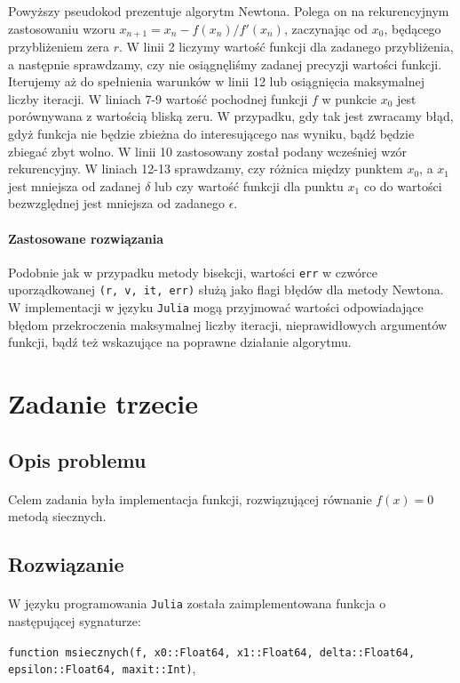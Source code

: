 \documentclass[a4paper]{article}
\begin{document}
Powyższy pseudokod prezentuje algorytm Newtona. Polega on na rekurencyjnym zastosowaniu wzoru $x_{n+1} = x_{n} - f(x_{n}) / f'(x_{n})$, zaczynając od $x_{0}$, będącego przybliżeniem zera $r$. W linii 2 liczymy wartość funkcji dla zadanego przybliżenia, a następnie sprawdzamy, czy nie osiągnęliśmy zadanej precyzji wartości funkcji. Iterujemy aż do spełnienia warunków w linii 12 lub osiągnięcia maksymalnej liczby iteracji. W liniach 7-9 wartość pochodnej funkcji $f$ w punkcie $x_{0}$ jest porównywana z wartością bliską zeru. W przypadku, gdy tak jest zwracamy błąd, gdyż funkcja nie będzie zbieżna do interesującego nas wyniku, bądź będzie zbiegać zbyt wolno. W linii 10 zastosowany został podany wcześniej wzór rekurencyjny. W liniach 12-13 sprawdzamy, czy różnica między punktem $x_{0}$, a $x_{1}$ jest mniejsza od zadanej $\delta$ lub czy wartość funkcji dla punktu $x_{1}$ co do wartości bezwzględnej jest mniejsza od zadanego $\epsilon$.

\paragraph{Zastosowane rozwiązania}
Podobnie jak w przypadku metody bisekcji, wartości \texttt{err} w czwórce uporządkowanej \texttt{(r, v, it, err)} służą jako flagi błędów dla metody Newtona. W implementacji w języku \texttt{Julia} mogą przyjmować wartości odpowiadające błędom przekroczenia maksymalnej liczby iteracji, nieprawidłowych argumentów funkcji, bądź też wskazujące na poprawne działanie algorytmu.

\section{Zadanie trzecie}

\subsection{Opis problemu}
\paragraph{}
Celem zadania była implementacja funkcji, rozwiązującej równanie $f(x) = 0$ metodą siecznych.

\subsection{Rozwiązanie}
\paragraph{}
W języku programowania \texttt{Julia} została zaimplementowana funkcja o następującej sygnaturze:
\begin{center}
\texttt{function msiecznych(f, x0::Float64, x1::Float64, delta::Float64, epsilon::Float64, maxit::Int)},
\end{center}
\end{document}
